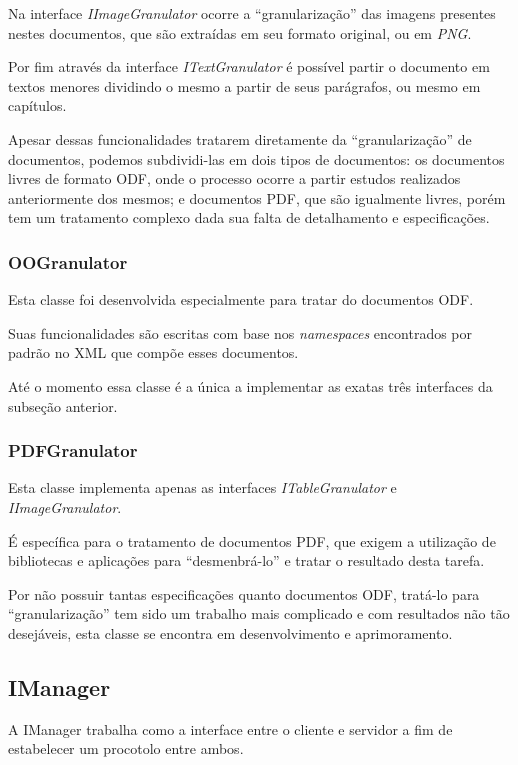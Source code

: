 {{Na interface \textit{IImageGranulator} ocorre a ``granularização'' das imagens presentes nestes documentos, que são extraídas em seu formato original, ou em \textit{PNG}.

Por fim através da interface \textit{ITextGranulator} é possível partir o documento em textos menores dividindo o mesmo a partir de seus parágrafos, ou mesmo em capítulos.

Apesar dessas funcionalidades tratarem diretamente da ``granularização'' de documentos, podemos subdividi-las em dois tipos de documentos: os documentos livres de formato ODF, onde o processo ocorre a partir estudos realizados anteriormente dos mesmos; e documentos PDF, que são igualmente livres, porém tem um tratamento complexo dada sua falta de detalhamento e especificações.


\subsubsection{OOGranulator}

Esta classe foi desenvolvida especialmente para tratar do documentos ODF.

Suas funcionalidades são escritas com base nos \textit{namespaces} encontrados por padrão no XML que compõe esses documentos.

Até o momento essa classe é a única a implementar as exatas três interfaces da subseção anterior.


\subsubsection{PDFGranulator}

Esta classe implementa apenas as interfaces \textit{ITableGranulator} e \textit{IImageGranulator}.

É específica para o tratamento de documentos PDF, que exigem a utilização de bibliotecas e aplicações para ``desmenbrá-lo'' e tratar o resultado desta tarefa.

Por não possuir tantas especificações quanto documentos ODF, tratá-lo para ``granularização'' tem sido um trabalho mais complicado e com resultados não tão desejáveis, esta classe se encontra em desenvolvimento e aprimoramento.


\subsection{IManager}

A IManager trabalha como a interface entre o cliente e servidor a fim de estabelecer um procotolo entre ambos.

}}
